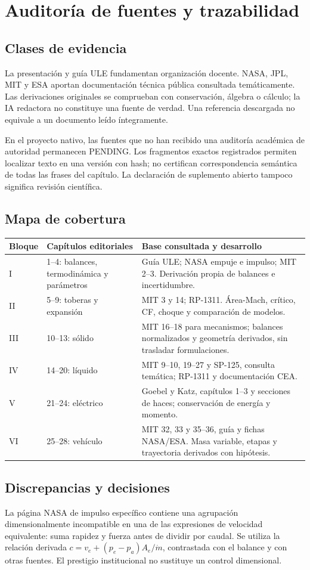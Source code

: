 \chapter{Auditoría de fuentes y trazabilidad}\label{app:sources}
\section{Clases de evidencia}
La presentación y guía ULE fundamentan organización docente. NASA, JPL, MIT y ESA aportan documentación técnica pública consultada temáticamente. Las derivaciones originales se comprueban con conservación, álgebra o cálculo; la IA redactora no constituye una fuente de verdad. Una referencia descargada no equivale a un documento leído íntegramente.

En el proyecto nativo, las fuentes que no han recibido una auditoría académica de autoridad permanecen PENDING. Los fragmentos exactos registrados permiten localizar texto en una versión con hash; no certifican correspondencia semántica de todas las frases del capítulo. La declaración de suplemento abierto tampoco significa revisión científica.
\section{Mapa de cobertura}
\begin{longtable}{p{.12\linewidth}p{.37\linewidth}p{.40\linewidth}}\toprule Bloque&Capítulos editoriales&Base consultada y desarrollo\\\midrule\endhead
I&1--4: balances, termodinámica y parámetros&Guía ULE; NASA empuje e impulso; MIT 2--3. Derivación propia de balances e incertidumbre.\\
II&5--9: toberas y expansión&MIT 3 y 14; RP-1311. Área-Mach, crítico, CF, choque y comparación de modelos.\\
III&10--13: sólido&MIT 16--18 para mecanismos; balances normalizados y geometría derivados, sin trasladar formulaciones.\\
IV&14--20: líquido&MIT 9--10, 19--27 y SP-125, consulta temática; RP-1311 y documentación CEA.\\
V&21--24: eléctrico&Goebel y Katz, capítulos 1--3 y secciones de haces; conservación de energía y momento.\\
VI&25--28: vehículo&MIT 32, 33 y 35--36, guía y fichas NASA/ESA. Masa variable, etapas y trayectoria derivados con hipótesis.\\\bottomrule\end{longtable}
\section{Discrepancias y decisiones}
La página NASA de impulso específico contiene una agrupación dimensionalmente incompatible en una de las expresiones de velocidad equivalente: suma rapidez y fuerza antes de dividir por caudal. Se utiliza la relación derivada $c=v_e+(p_e-p_a)A_e/\dot m$, contrastada con el balance y con otras fuentes. El prestigio institucional no sustituye un control dimensional.

